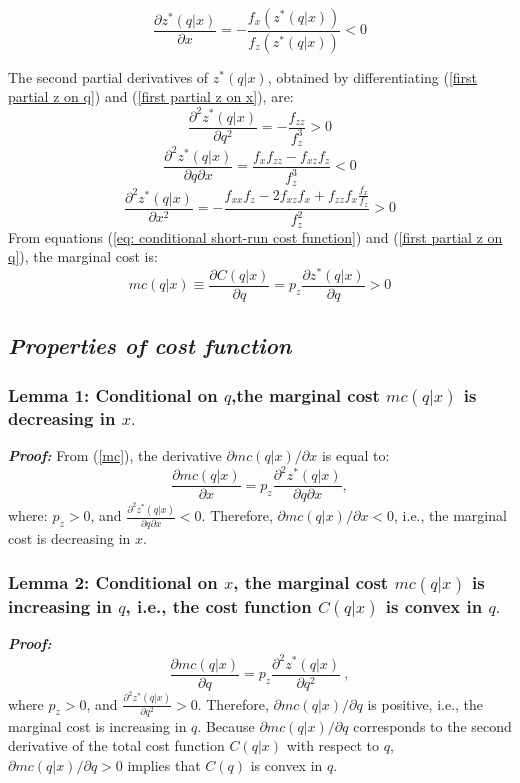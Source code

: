 \documentclass{article}
\begin{document}
\begin{equation}
    \frac{\partial z^*(q|x)}{\partial x}=-\frac{f_x\left(z^*(q|x)\right)}{f_z\left(z^*(q|x)\right)}<0
\label{first partial z on x}
\end{equation}

The second partial derivatives of $z^*(q|x)$, obtained by differentiating (\ref{first partial z on q}) and (\ref{first partial z on x}), are:
\begin{equation}
    \frac{\partial^2z^*(q|x)}{\partial q^2}=-\frac{f_{zz}}{f_z^3}>0
\end{equation}
\begin{equation}
    \frac{\partial^2z^*(q|x)}{\partial q\partial x}=\frac{f_xf_{zz}-f_{xz}f_z}{f_z^3}<0
\end{equation}
\begin{equation}
    \frac{\partial^2z^*(q|x)}{\partial x^2}=-\frac{f_{xx}f_z-2f_{xz}f_x+f_{zz}f_x\frac{f_x}{f_z}}{f_z^2}>0
    \label{xx}
\end{equation}
From equations (\ref{eq: conditional short-run cost function}) and (\ref{first partial z on q}), the marginal cost is:
\begin{equation}
    mc(q|x)\equiv\frac{\partial C(q|x)}{\partial q}=p_z\frac{\partial z^*(q|x)}{\partial q}>0
    \label{mc}
\end{equation}

\subsection*{\textit{Properties of cost function}}
\subsubsection*{Lemma 1: Conditional on $q$,the marginal cost $mc(q|x)$ is decreasing in $x.$}
\textbf{\textit{Proof:}}
From (\ref{mc}), the derivative $\partial mc(q|x)/\partial x$ is equal to:
$$\frac{\partial mc(q|x)}{\partial x}=p_z\frac{\partial^2z^*(q|x)}{\partial q\partial x},$$
where: $p_z>0$, and $\frac{\partial^2z^*(q|x)}{\partial q\partial x}<0$. Therefore, $\partial mc(q|x)/\partial x<0$, i.e., the marginal cost is
decreasing in $x$.

\subsubsection*{Lemma 2: Conditional on $x$, the marginal cost $mc(q|x)$ is increasing in $q$, i.e., the cost function $C(q|x)$ is convex in $q.$}
\textbf{\textit{Proof:}}
$$\frac{\partial mc(q|x)}{\partial q}=p_z\frac{\partial^2z^*(q|x)}{\partial q^2}\:,$$
where $p_z>0$, and $\frac{\partial^2z^*(q|x)}{\partial q^2}>0$. Therefore, $\partial mc(q|x)/\partial q$ is positive, i.e., the marginal cost is increasing in $q.$
Because $\partial mc(q|x)/\partial q$ corresponds to the second derivative of the total cost function $C(q|x)$ with respect to $q$, $\partial mc(q|x)/\partial q>0$ implies that $C(q)$ is convex in $q$. 
\end{document}
